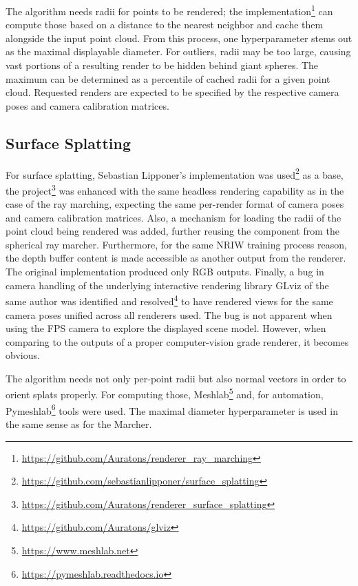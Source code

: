 The algorithm needs radii for points to be rendered; the
implementation\footnote{\url{https://github.com/Auratons/renderer_ray_marching}} can
compute those based on a distance to the nearest neighbor and cache them alongside the
input point cloud. From this process, one hyperparameter stems out as the maximal displayable
diameter. For outliers, radii may be too large, causing vast portions of a resulting
render to be hidden behind giant spheres. The maximum can be determined as a percentile
of cached radii for a given point cloud. Requested renders are expected to be
specified by the respective camera poses and camera calibration matrices.


\subsection{Surface Splatting}

For surface splatting, Sebastian Lipponer's implementation was
used\footnote{\url{https://github.com/sebastianlipponer/surface_splatting}} as a base, the
project\footnote{\url{https://github.com/Auratons/renderer_surface_splatting}} was
enhanced with the same headless rendering capability as in the case of the ray marching,
expecting the same per-render format of camera poses and camera calibration matrices.
Also, a mechanism for loading the radii of the point cloud being rendered was added, further
reusing the component from the spherical ray marcher. Furthermore, for the same NRIW
training process reason, the depth buffer content is made accessible as another output from
the renderer. The original implementation produced only RGB outputs. Finally, a bug in
camera handling of the underlying interactive rendering library GLviz of the same author
was identified and resolved\footnote{\url{https://github.com/Auratons/glviz}} to have
rendered views for the same camera poses unified across all renderers used. The bug is
not apparent when using the FPS camera to explore the displayed scene model. However,
when comparing to the outputs of a proper computer-vision grade renderer, it becomes obvious.

The algorithm needs not only per-point radii but also normal vectors in order to orient
splats properly. For computing those, Meshlab\footnote{\url{https://www.meshlab.net}} and,
for automation, Pymeshlab\footnote{\url{https://pymeshlab.readthedocs.io}} tools were
used. The maximal diameter hyperparameter is used in the same sense as for the Marcher.


